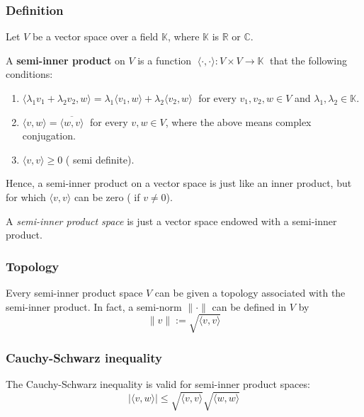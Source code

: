 \documentclass[12pt]{article}
\begin{document}
\subsubsection{Definition}

Let $V$ be a vector space over a field $\mathbb{K}$, where $\mathbb{K}$ is $\mathbb{R}$ or $\mathbb{C}$.

A {\bf semi-inner product} on $V$ is a function $\;\langle \cdot , \cdot \rangle : V \times V \longrightarrow \mathbb{K}\;$ that  the following conditions:

\begin{enumerate}
\item $\langle \lambda_1 v_1 + \lambda_2 v_2 , w \rangle = \lambda_1 \langle v_1 , w \rangle + \lambda_2 \langle v_2 , w \rangle\;$ for every $v_1, v_2, w \in V$ and $\lambda_1, \lambda_2 \in \mathbb{K}$.
\item $\langle v ,w \rangle = \overline{\langle w ,v \rangle}\;$ for every $v, w \in V$, where the  above means complex conjugation. 
\item $\langle v ,v \rangle \geq 0$ ( semi definite).
\end{enumerate}

Hence, a semi-inner product on a vector space is just like an inner product, but for which $\langle v ,v \rangle$ can be zero ( if $v \neq 0$).

A \emph{semi-inner product space} is just a vector space endowed with a semi-inner product.

\subsubsection{Topology}

Every semi-inner product space $V$ can be given a topology associated with the semi-inner product. In fact, a semi-norm $\| \cdot \|$ can be defined in $V$ by
\begin{displaymath}
\|v\| := \sqrt{\langle v ,v \rangle}
\end{displaymath}

\subsubsection{Cauchy-Schwarz inequality}

The Cauchy-Schwarz inequality is valid for semi-inner product spaces:
\begin{displaymath}
|\langle v , w \rangle| \leq \sqrt{\langle v,v \rangle}\sqrt{\langle w, w \rangle}
\end{displaymath}
\end{document}
